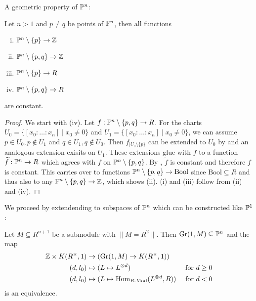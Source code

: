 A geometric property of $\mathbb{P}^n$:

\begin{lemma}\label{constant-functions-Pn-minus-points}
  Let $n>1$ and $p\neq q$ be points of $\mathbb{P}^n$, then all functions
  \begin{center}
  \begin{enumerate}[(i)]
  \item $\mathbb{P}^n\setminus\{p\}\to \mathbb{Z}$
  \item $\mathbb{P}^n\setminus\{p,q\}\to \mathbb{Z}$
  \item $\mathbb{P}^n\setminus\{p\}\to R$
  \item $\mathbb{P}^n\setminus\{p,q\}\to R$
  \end{enumerate}
  \end{center}
  are constant.
\end{lemma}

\begin{proof}
  We start with (iv).
  Let $f:\mathbb{P}^n\setminus\{p,q\}\to R$.
  For the charts $U_0=\{[x_0:\dots:x_n]\mid x_0\neq 0\}$ and $U_1=\{[x_0:\dots:x_n]\mid x_0\neq 0\}$, we can assume $p\in U_0, p\notin U_1$ and $q\in U_1, q\notin U_0$.
  Then $f_{|U_0\setminus\{p\}}$ can be extended to $U_0$ by  and an analogous extension exisits on $U_1$.
  These extensions glue with $f$ to a function $\widetilde{f}:\mathbb{P}^n\to R$ which agrees with $f$ on $\mathbb{P}^n\setminus\{p,q\}$.
  By , $\widetilde{f}$ is constant and therefore $f$ is constant.
  This carries over to functions $\mathbb{P}^n\setminus\{p,q\}\to \mathrm{Bool}$ since $\mathrm{Bool}\subseteq R$ and thus also to any $\mathbb{P}^n\setminus\{p,q\}\to \mathbb{Z}$,
  which shows (ii).
  (i) and (iii) follow from (ii) and (iv).
\end{proof}
We proceed by extendending  to subspaces of $\mathbb{P}^n$ which can be constructed like $\mathbb{P}^1$:

\begin{lemma}\label{line-bundle-on-line}
  Let $M\subseteq R^{n+1}$ be a submodule with $\|M=R^2\|$.
  Then $\mathrm{Gr}(1,M)\subseteq \mathbb{P}^n$ and the map
  \begin{align*}
    \mathbb{Z}\times K(R^{\times},1) &\to (\mathrm{Gr}(1,M)\to K(R^{\times},1)) &\\
    (d,l_0) &\mapsto (L\mapsto L^{\otimes d}) &\text{ for $d\geq 0$} \\
    (d,l_0) &\mapsto (L\mapsto \mathrm{Hom}_{R\text{-}\mathrm{Mod}}(L^{\otimes d},R)) &\text{ for $d< 0$} 
  \end{align*}
  is an equivalence.
\end{lemma}

